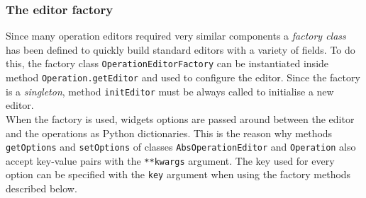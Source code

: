 \subsubsection{The editor factory}\label{sssec:factory-usage}
Since many operation editors required very similar components a \textit{factory class} has been defined to quickly build standard editors with a variety of fields. To do this, the factory class \texttt{OperationEditorFactory} can be instantiated inside method \texttt{Operation.getEditor} and used to configure the editor. Since the factory is a \textit{singleton}, method \texttt{initEditor} must be always called to initialise a new editor.\\
When the factory is used, widgets options are passed around between the editor and the operations as Python dictionaries. This is the reason why methods \texttt{getOptions} and \texttt{setOptions} of classes \texttt{AbsOperationEditor} and \texttt{Operation} also accept key-value pairs with the \texttt{**kwargs} argument. The key used for every option can be specified with the \texttt{key} argument when using the factory methods described below.
